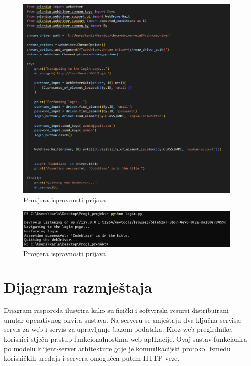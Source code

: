 				\begin{figure} [H]
					\centering
					\includegraphics[width=0.7\linewidth]{slike/LoginSelenium.png}
					\caption{Provjera ispravnosti prijava}
					\label{fig:Provjera ispravnosti prijava}
				\end{figure}
				\begin{figure} [H]
					\centering
					\includegraphics[width=0.7\linewidth]{slike/LoginSeleniumOutput.png}
					\caption{Provjera ispravnosti prijava}
					\label{fig:Provjera ispravnosti prijava}
				\end{figure}
                                  




			
			\eject 
		
		
		\section{Dijagram razmještaja}
			
			Dijagram rasporeda ilustrira kako su fizički i softverski resursi distribuirani unutar operativnog okvira sustava. Na serveru se smještaju dva ključna servisa: servis za web i servis za upravljanje bazom podataka. Kroz web preglednike, korisnici stječu pristup funkcionalnostima web aplikacije. Ovaj sustav funkcionira po modelu klijent-server arhitekture gdje je komunikacijski protokol između korisničkih uređaja i servera omogućen putem HTTP veze.


